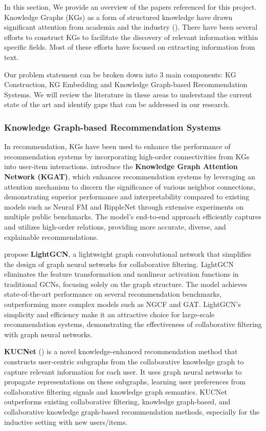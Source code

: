 \documentclass{article}
\begin{document}
In this section, We provide an overview of the papers referenced for this
project. Knowledge Graphs (KGs) as a form of structured knowledge have drawn
significant attention from academia and the industry (\cite{ji2022survey}).
There have been several efforts to construct KGs to facilitate the discovery of
relevant information within specific fields. Most of these efforts have focused
on extracting information from text.

Our problem statement can be broken down into 3 main components: KG
Construction, KG Embedding and Knowledge Graph-based Recommendation Systems. We
will review the literature in these areas to understand the current state of
the art and identify gaps that can be addressed in our research.

\subsubsection{Knowledge Graph-based Recommendation Systems}

In recommendation, KGs have been used to enhance the performance of
recommendation systems by incorporating high-order connectivities from KGs into
user-item interactions. \textbf{\cite{wang2019kgat}} introduce the
\textbf{Knowledge Graph Attention Network (KGAT)}, which enhances
recommendation systems by leveraging an attention mechanism to discern the
significance of various neighbor connections, demonstrating superior
performance and interpretability compared to existing models such as Neural FM
and RippleNet through extensive experiments on multiple public benchmarks. The
model's end-to-end approach efficiently captures and utilizes high-order
relations, providing more accurate, diverse, and explainable recommendations.

\textbf{\cite{he2020lightgcn}} propose \textbf{LightGCN}, a lightweight graph
convolutional network that simplifies the design of graph neural networks for
collaborative filtering. LightGCN eliminates the feature transformation and
nonlinear activation functions in traditional GCNs, focusing solely on the
graph structure. The model achieves state-of-the-art performance on several
recommendation benchmarks, outperforming more complex models such as NGCF and
GAT. LightGCN's simplicity and efficiency make it an attractive choice for
large-scale recommendation systems, demonstrating the effectiveness of
collaborative filtering with graph neural networks.

\textbf{KUCNet} (\textbf{\cite{liu2024knowledgeenhanced}}) is a novel
knowledge-enhanced recommendation method that constructs user-centric subgraphs
from the collaborative knowledge graph to capture relevant information for each
user. It uses graph neural networks to propagate representations on these
subgraphs, learning user preferences from collaborative filtering signals and
knowledge graph semantics. KUCNet outperforms existing collaborative filtering,
knowledge graph-based, and collaborative knowledge graph-based recommendation
methods, especially for the inductive setting with new users/items.
\end{document}
